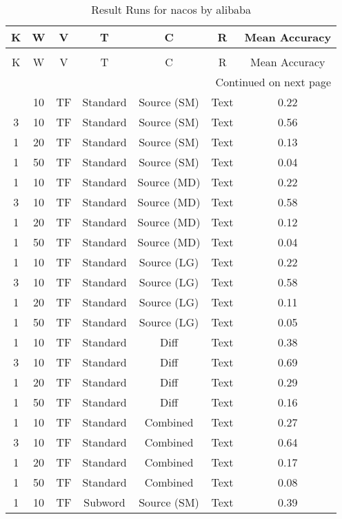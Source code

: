 \begin{longtable}{|c|c|c|c|c|c|c|}
\hline
K & W & V & T & C & R & Mean Accuracy \\
\hline
\endfirsthead
\caption[]{Continued from previous page} \\
\hline
K & W & V & T & C & R & Mean Accuracy \\
\hline
\endhead
\hline
\multicolumn{7}{r}{Continued on next page} \\
\endfoot
\hline
\caption{Result Runs for nacos by alibaba} 
\label{result-runs-nacos-alibaba}
\endlastfoot
1 & 10 & TF & Standard & Source (SM) & Text & 0.22 \\
\hline
3 & 10 & TF & Standard & Source (SM) & Text & 0.56 \\
\hline
1 & 20 & TF & Standard & Source (SM) & Text & 0.13 \\
\hline
1 & 50 & TF & Standard & Source (SM) & Text & 0.04 \\
\hline
1 & 10 & TF & Standard & Source (MD) & Text & 0.22 \\
\hline
3 & 10 & TF & Standard & Source (MD) & Text & 0.58 \\
\hline
1 & 20 & TF & Standard & Source (MD) & Text & 0.12 \\
\hline
1 & 50 & TF & Standard & Source (MD) & Text & 0.04 \\
\hline
1 & 10 & TF & Standard & Source (LG) & Text & 0.22 \\
\hline
3 & 10 & TF & Standard & Source (LG) & Text & 0.58 \\
\hline
1 & 20 & TF & Standard & Source (LG) & Text & 0.11 \\
\hline
1 & 50 & TF & Standard & Source (LG) & Text & 0.05 \\
\hline
1 & 10 & TF & Standard & Diff & Text & 0.38 \\
\hline
3 & 10 & TF & Standard & Diff & Text & 0.69 \\
\hline
1 & 20 & TF & Standard & Diff & Text & 0.29 \\
\hline
1 & 50 & TF & Standard & Diff & Text & 0.16 \\
\hline
1 & 10 & TF & Standard & Combined & Text & 0.27 \\
\hline
3 & 10 & TF & Standard & Combined & Text & 0.64 \\
\hline
1 & 20 & TF & Standard & Combined & Text & 0.17 \\
\hline
1 & 50 & TF & Standard & Combined & Text & 0.08 \\
\hline
1 & 10 & TF & Subword & Source (SM) & Text & 0.39 \\

\end{longtable}

